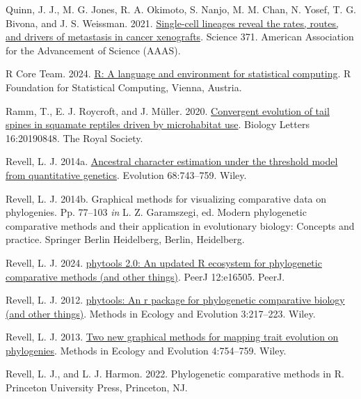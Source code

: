 \documentclass{article}
\newlength{\cslhangindent}
\newenvironment{CSLReferences}[2] %
 {\begin{list}{}{%
  \setlength{\itemindent}{0pt}
  \setlength{\leftmargin}{0pt}
  \setlength{\parsep}{0pt}
  \ifodd #1
   \setlength{\leftmargin}{\cslhangindent}
   \setlength{\itemindent}{-1\cslhangindent}
  \fi
  \setlength{\itemsep}{#2\baselineskip}}}
 {\end{list}}
\begin{document}
\begin{CSLReferences}{1}{0}
Quinn, J. J., M. G. Jones, R. A. Okimoto, S. Nanjo, M. M. Chan, N. Yosef, T. G. Bivona, and J. S. Weissman. 2021. \href{https://doi.org/10.1126/science.abc1944}{Single-cell lineages reveal the rates, routes, and drivers of metastasis in cancer xenografts}. Science 371. American Association for the Advancement of Science (AAAS).

R Core Team. 2024. \href{https://www.R-project.org/}{R: A language and environment for statistical computing}. R Foundation for Statistical Computing, Vienna, Austria.

Ramm, T., E. J. Roycroft, and J. Müller. 2020. \href{https://doi.org/10.1098/rsbl.2019.0848}{Convergent evolution of tail spines in squamate reptiles driven by microhabitat use}. Biology Letters 16:20190848. The Royal Society.

Revell, L. J. 2014a. \href{https://doi.org/10.1111/evo.12300}{Ancestral character estimation under the threshold model from quantitative genetics}. Evolution 68:743--759. Wiley.

Revell, L. J. 2014b. Graphical methods for visualizing comparative data on phylogenies. Pp. 77--103 \emph{in} L. Z. Garamszegi, ed. Modern phylogenetic comparative methods and their application in evolutionary biology: Concepts and practice. Springer Berlin Heidelberg, Berlin, Heidelberg.

Revell, L. J. 2024. \href{https://doi.org/10.7717/peerj.16505}{{p}hytools 2.0: An updated {R} ecosystem for phylogenetic comparative methods (and other things)}. PeerJ 12:e16505. PeerJ.

Revell, L. J. 2012. \href{https://doi.org/10.1111/j.2041-210x.2011.00169.x}{{p}hytools: An r package for phylogenetic comparative biology (and other things)}. Methods in Ecology and Evolution 3:217--223. Wiley.

Revell, L. J. 2013. \href{https://doi.org/10.1111/2041-210x.12066}{Two new graphical methods for mapping trait evolution on phylogenies}. Methods in Ecology and Evolution 4:754--759. Wiley.

Revell, L. J., and L. J. Harmon. 2022. Phylogenetic comparative methods in {R}. Princeton University Press, Princeton, NJ.


\end{CSLReferences}
\end{document}
